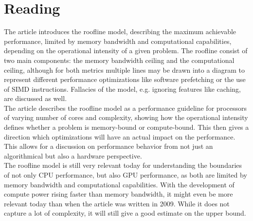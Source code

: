 
\newpage
\section{Reading}
The article introduces the roofline model, describing the maximum achievable performance, limited by memory bandwidth and computational capabilities, depending on the operational intensity of a given problem. The roofline consist of two main components: the memory bandwidth ceiling and the computational ceiling, although for both metrics multiple lines may be drawn into a diagram to represent different performance optimizations like software prefetching or the use of SIMD instructions. Fallacies of the model, e.g. ignoring features like caching, are discussed as well.\\
The article describes the roofline model as a performance guideline for processors of varying number of cores and complexity, showing how the operational intensity defines whether a problem is memory-bound or compute-bound. This then gives a direction which optimizations will have an actual impact on the performance. This allows for a discussion on performance behavior from not just an algorithmical but also a hardware perspective.\\
The roofline model is still very relevant today for understanding the boundaries of not only CPU performance, but also GPU performance, as both are limited by memory bandwidth and computational capabilities. With the development of compute power rising faster than memory bandwidth, it might even be more relevant today than when the article was written in 2009. While it does not capture a lot of complexity, it will still give a good estimate on the upper bound.
